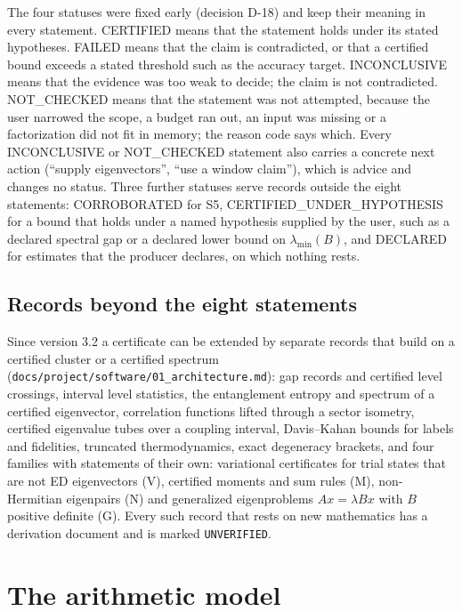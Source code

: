 \documentclass[11pt,a4paper]{article}
\newcommand{\code}[1]{\texttt{#1}}
\newcommand{\status}[1]{\textsf{#1}}
\newcommand{\CERT}{\status{CERTIFIED}}
\newcommand{\FAIL}{\status{FAILED}}
\newcommand{\INC}{\status{INCONCLUSIVE}}
\newcommand{\NC}{\status{NOT\_CHECKED}}
\begin{document}
The four statuses were fixed early (decision D-18) and keep their meaning in every statement. \CERT{} means that the
statement holds under its stated hypotheses. \FAIL{} means that the claim is contradicted, or that a certified bound
exceeds a stated threshold such as the accuracy target. \INC{} means that the evidence was too weak to decide; the
claim is not contradicted. \NC{} means that the statement was not attempted, because the user narrowed the scope, a
budget ran out, an input was missing or a factorization did not fit in memory; the reason code says which. Every
\INC{} or \NC{} statement also carries a concrete next action (``supply eigenvectors'', ``use a window claim''), which
is advice and changes no status. Three further statuses serve records outside the eight statements:
\status{CORROBORATED} for S5, \status{CERTIFIED\_UNDER\_HYPOTHESIS} for a bound that holds under a named hypothesis
supplied by the user, such as a declared spectral gap or a declared lower bound on $\lambda_{\min}(B)$, and
\status{DECLARED} for estimates that the producer declares, on which nothing rests.

\subsection{Records beyond the eight statements}

Since version 3.2 a certificate can be extended by separate records that build on a certified cluster or a certified
spectrum (\code{docs/project/software/01\_architecture.md}): gap records and certified level crossings, interval level
statistics, the entanglement entropy and spectrum of a certified eigenvector, correlation functions lifted through a
sector isometry, certified eigenvalue tubes over a coupling interval, Davis--Kahan bounds \cite{DavisKahan1970} for
labels and fidelities, truncated thermodynamics, exact degeneracy brackets, and four families with statements of their
own: variational certificates for trial states that are not ED eigenvectors (V), certified moments and sum rules (M),
non-Hermitian eigenpairs (N) and generalized eigenproblems $Ax=\lambda Bx$ with $B$ positive definite (G). Every such
record that rests on new mathematics has a derivation document and is marked \code{UNVERIFIED}.

\section{The arithmetic model}
\label{sec:fp}
\end{document}

